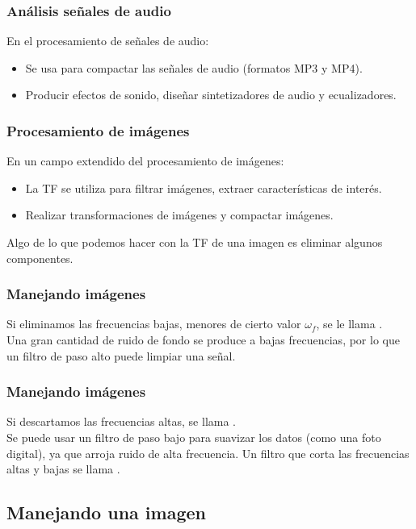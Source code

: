\begin{frame}
\frametitle{Análisis señales de audio}    
En el procesamiento de señales de audio:
\pause
\begin{itemize}
\item Se usa para compactar las señales de audio (formatos MP3 y MP4).
\item Producir efectos de sonido, diseñar sintetizadores de audio y ecualizadores.
\end{itemize}
\end{frame}
\begin{frame}
\frametitle{Procesamiento de imágenes}    
En un campo extendido del procesamiento de imágenes:
\pause
\begin{itemize}
\item La TF se utiliza para filtrar imágenes, extraer características de interés.
\item Realizar transformaciones de imágenes y compactar imágenes.
\end{itemize}
Algo de lo que podemos hacer con la TF de una imagen es eliminar algunos componentes.
\end{frame}
\begin{frame}
\frametitle{Manejando imágenes}    
Si eliminamos las frecuencias bajas, menores de cierto valor $\omega_{f}$, \pause se le llama .
\\
\bigskip
\pause
Una gran cantidad de ruido de fondo se produce a bajas frecuencias, por lo que un filtro de paso alto puede limpiar una señal.
\end{frame}
\begin{frame}
\frametitle{Manejando imágenes}
Si descartamos las frecuencias altas, se llama .
\\
\bigskip
\pause
Se puede usar un filtro de paso bajo para suavizar los datos (como una foto digital), ya que arroja ruido de alta frecuencia. \pause Un filtro que corta las frecuencias altas y bajas se llama .
\end{frame}

\subsection{Manejando una imagen}

